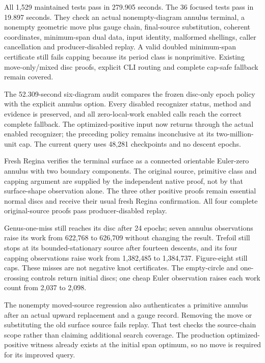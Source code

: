 All 1,529 maintained tests pass in 279.905 seconds. The 36 focused tests
pass in 19.897 seconds. They check an actual nonempty-diagram annulus terminal,
a nonempty geometric move plus gauge chain, final-source substitution,
coherent coordinates, minimum-span dual data, input identity, malformed
shellings, caller cancellation and producer-disabled replay. A valid doubled
minimum-span certificate still fails capping because its period class is
nonprimitive. Existing move-only/mixed disc proofs, explicit CLI routing and
complete cap-safe fallback remain covered.

The 52.309-second six-diagram audit compares the frozen disc-only epoch policy
with the explicit annulus option. Every disabled recognizer status, method
and evidence is preserved, and all zero-local-work enabled calls reach the
correct complete fallback. The optimized-positive input now returns
 through the actual enabled recognizer; the
preceding policy remains inconclusive at its two-million-unit cap. The
current query uses 48,281 checkpoints and no descent epochs.

Fresh Regina verifies the terminal surface as a connected orientable Euler-zero
annulus with two boundary components. The original source, primitive class
and capping argument are supplied by the independent native proof, not by
that surface-shape observation alone. The three other positive proofs remain
essential normal discs and receive their usual fresh Regina confirmation.
All four complete original-source proofs pass producer-disabled replay.

Genus-one-miss still reaches its disc after 24 epochs; seven annulus observations
raise its work from 622,768 to 626,709 without changing the result. Trefoil
still stops at its bounded-stationary source after fourteen descents, and
its four capping observations raise work from 1,382,485 to 1,384,737.
Figure-eight still caps. These misses are not negative knot certificates.
The empty-circle and one-crossing controls return initial discs; one cheap
Euler observation raises each work count from 2,037 to 2,098.

The nonempty moved-source regression also authenticates a primitive annulus
after an actual upward replacement and a gauge record. Removing the move
or substituting the old surface source fails replay. That test checks the
source-chain scope rather than claiming additional search coverage. The
production optimized-positive witness already exists at the initial span
optimum, so no move is required for its improved query.

